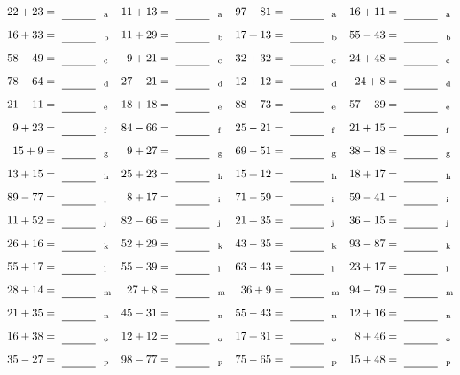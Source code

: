 \documentclass
[
  draft    = true,
  fontsize = 11pt,
  parskip  = half-
]
{scrartcl}
\begin{document}
\clearpage
\begin{align*}
    \pline{22+23}&=\rline{a}
  & \pline{11+13}&=\rline{a}
  & \pline{97-81}&=\rline{a}
  & \pline{16+11}&=\rline{a} \\[1ex]
    \pline{16+33}&=\rline{b}
  & \pline{11+29}&=\rline{b}
  & \pline{17+13}&=\rline{b}
  & \pline{55-43}&=\rline{b} \\[1ex]
    \pline{58-49}&=\rline{c}
  & \pline{9+21}&=\rline{c}
  & \pline{32+32}&=\rline{c}
  & \pline{24+48}&=\rline{c} \\[1ex]
    \pline{78-64}&=\rline{d}
  & \pline{27-21}&=\rline{d}
  & \pline{12+12}&=\rline{d}
  & \pline{24+8}&=\rline{d} \\[1ex]
    \pline{21-11}&=\rline{e}
  & \pline{18+18}&=\rline{e}
  & \pline{88-73}&=\rline{e}
  & \pline{57-39}&=\rline{e} \\[1ex]
    \pline{9+23}&=\rline{f}
  & \pline{84-66}&=\rline{f}
  & \pline{25-21}&=\rline{f}
  & \pline{21+15}&=\rline{f} \\[1ex]
    \pline{15+9}&=\rline{g}
  & \pline{9+27}&=\rline{g}
  & \pline{69-51}&=\rline{g}
  & \pline{38-18}&=\rline{g} \\[1ex]
    \pline{13+15}&=\rline{h}
  & \pline{25+23}&=\rline{h}
  & \pline{15+12}&=\rline{h}
  & \pline{18+17}&=\rline{h} \\[1ex]
    \pline{89-77}&=\rline{i}
  & \pline{8+17}&=\rline{i}
  & \pline{71-59}&=\rline{i}
  & \pline{59-41}&=\rline{i} \\[1ex]
    \pline{11+52}&=\rline{j}
  & \pline{82-66}&=\rline{j}
  & \pline{21+35}&=\rline{j}
  & \pline{36-15}&=\rline{j} \\[1ex]
    \pline{26+16}&=\rline{k}
  & \pline{52+29}&=\rline{k}
  & \pline{43-35}&=\rline{k}
  & \pline{93-87}&=\rline{k} \\[1ex]
    \pline{55+17}&=\rline{l}
  & \pline{55-39}&=\rline{l}
  & \pline{63-43}&=\rline{l}
  & \pline{23+17}&=\rline{l} \\[1ex]
    \pline{28+14}&=\rline{m}
  & \pline{27+8}&=\rline{m}
  & \pline{36+9}&=\rline{m}
  & \pline{94-79}&=\rline{m} \\[1ex]
    \pline{21+35}&=\rline{n}
  & \pline{45-31}&=\rline{n}
  & \pline{55-43}&=\rline{n}
  & \pline{12+16}&=\rline{n} \\[1ex]
    \pline{16+38}&=\rline{o}
  & \pline{12+12}&=\rline{o}
  & \pline{17+31}&=\rline{o}
  & \pline{8+46}&=\rline{o} \\[1ex]
    \pline{35-27}&=\rline{p}
  & \pline{98-77}&=\rline{p}
  & \pline{75-65}&=\rline{p}
  & \pline{15+48}&=\rline{p}
\end{align*}
\end{document}
